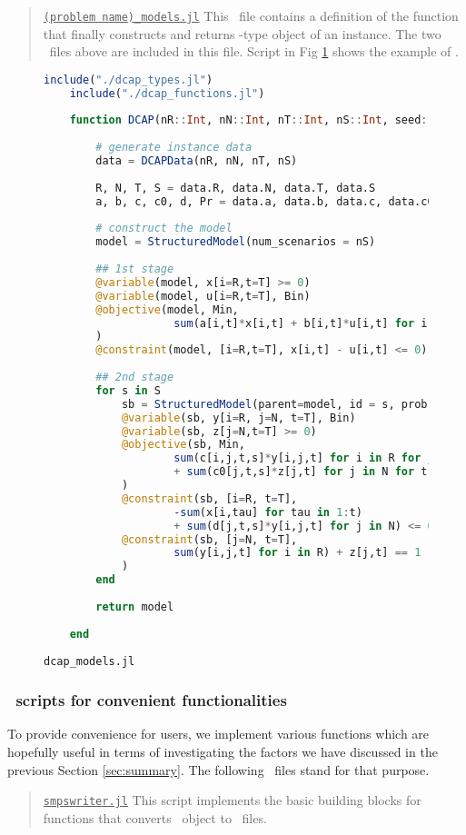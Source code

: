 \begin{quote}
\noindent\underline{\texttt{(problem name)\_models.jl}} This \julia\ file contains a definition of the function that finally constructs and returns \jumpmodel-type object of an instance. The two \julia\ files above are included in this file. Script in Fig \ref{fig:dcap_models} shows the example of \dcap.
\end{quote}
\begin{figure}[H]
	\centering
	\begin{lstlisting}[frame=single,language=julia]
	include("./dcap_types.jl")
	include("./dcap_functions.jl")
	
	function DCAP(nR::Int, nN::Int, nT::Int, nS::Int, seed::Int)::JuMP.Model
	
		# generate instance data
		data = DCAPData(nR, nN, nT, nS)
		
		R, N, T, S = data.R, data.N, data.T, data.S
		a, b, c, c0, d, Pr = data.a, data.b, data.c, data.c0, data.d, data.Pr
		
		# construct the model
		model = StructuredModel(num_scenarios = nS)
		
		## 1st stage
		@variable(model, x[i=R,t=T] >= 0)
		@variable(model, u[i=R,t=T], Bin)
		@objective(model, Min, 
					sum(a[i,t]*x[i,t] + b[i,t]*u[i,t] for i in R for t in T)
		)
		@constraint(model, [i=R,t=T], x[i,t] - u[i,t] <= 0)
		
		## 2nd stage
		for s in S
			sb = StructuredModel(parent=model, id = s, prob = Pr[s])
			@variable(sb, y[i=R, j=N, t=T], Bin)
			@variable(sb, z[j=N,t=T] >= 0)
			@objective(sb, Min, 
					sum(c[i,j,t,s]*y[i,j,t] for i in R for j in N for t in T) 
					+ sum(c0[j,t,s]*z[j,t] for j in N for t in T)
			)
			@constraint(sb, [i=R, t=T], 
					-sum(x[i,tau] for tau in 1:t) 
					+ sum(d[j,t,s]*y[i,j,t] for j in N) <= 0)
			@constraint(sb, [j=N, t=T], 
					sum(y[i,j,t] for i in R) + z[j,t] == 1
			)
		end
	
		return model
		
	end
	\end{lstlisting}
	\caption{\texttt{dcap\_models.jl}}\label{fig:dcap_models}
\end{figure}

\subsubsection{\julia\ scripts for convenient functionalities}
To provide convenience for users, we implement various functions which are hopefully useful in terms of investigating the factors we have discussed in the previous Section \ref{sec:summary}. The following \julia\ files stand for that purpose.
\begin{quotation}
	\noindent\underline{\texttt{smpswriter.jl}} This script implements the basic building blocks for functions that converts \jumpmodel\ object to \smps\ files. 
\end{quotation}

